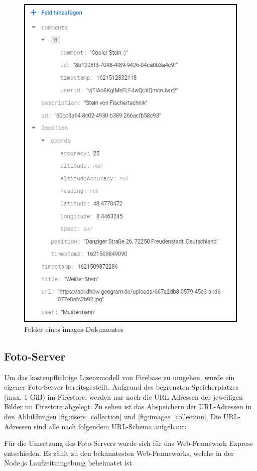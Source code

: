 \begin{figure}[H]
    \centering
    \includegraphics[width=.7\linewidth]{images/collection_images.png}
    \caption{Felder eines \glqq images\grqq{}-Dokumentes}
    \label{fig:images_collection}
\end{figure}

\subsection{Foto-Server\label{sup3.2.3:Unterpunkt-3}}

Um das kostenpflichtige Lizenzmodell von Firebase zu umgehen, wurde ein eigener Foto-Server bereitsgestellt. Aufgrund des begrenzten Speicherplatzes (max. 1 GiB) im Firestore, werden nur noch die URL-Adressen der jeweiligen Bilder im Firestore abgelegt. Zu sehen ist das Abspeichern der URL-Adressen in den Abbildungen \autoref{fig:users_collection} und \autoref{fig:images_collection}. Die URL-Adressen sind alle nach folgendem URL-Schema aufgebaut:

\noindent{}

Für die Umsetzung des Foto-Servers wurde sich für das Web-Framework \glqq Express\grqq{} entschieden. Es zählt zu den bekanntesten Web-Frameworks, welche in der Node.js Laufzeitumgebung beheimatet ist.


